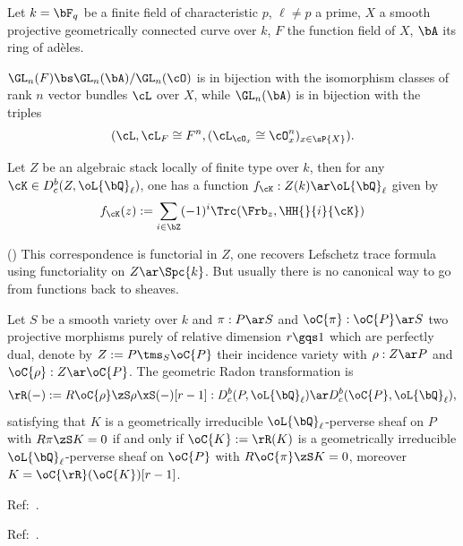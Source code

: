 \documentclass[a4paper, twoside]{article}
\begin{document}
\confighead{}{}{}


\begin{stp}
	Let $k=\bF_{q}$ be a finite field of characteristic $p$, $\ell\neq p$ a prime, $X$ a smooth projective geometrically connected curve over $k$, $F$ the function field of $X$, $\bA$ its ring of ad{\`e}les.
\end{stp}


$\GL_{n}(F)\bs\GL_{n}(\bA)/\GL_{n}(\cO)$ is in bijection with the isomorphism classes of rank $n$ vector bundles $\cL$ over $X$, while $\GL_{n}(\bA)$ is in bijection with the triples
\[
	(\cL, \cL_{F}\cong F^{n}, (\cL_{\cO_{x}}\cong\cO_{x}^{n})_{x\in\sP{X}}).
\]

Let $Z$ be an algebraic stack locally of finite type over $k$, then for any $\cK\in D_{c}^{b}(Z,\oL{\bQ}_{\ell})$, one has a function $f_{\cK}:Z(k)\ar\oL{\bQ}_{\ell}$ given by
\[
	f_{\cK}(z):=\sum_{i\in\bZ}(-1)^{i}\Trc(\Frb_{z},\HH{}{i}{\cK})
\]

\begin{rmk}
	(\cite[2.5]{Yun2014Rigidity}) This correspondence is functorial in $Z$, one recovers Lefschetz trace formula using functoriality on $Z\ar\Spc{k}$. But usually there is no canonical way to go from functions back to sheaves.
\end{rmk}

Let $S$ be a smooth variety over $k$ and $\pi:P\ar S$ and $\oC{\pi}:\oC{P}\ar S$ two projective morphisms purely of relative dimension $r\gqs1$ which are perfectly dual, denote by $Z:=P\tms_{S}\oC{P}$ their incidence variety with $\rho:Z\ar P$ and $\oC{\rho}:Z\ar\oC{P}$. The geometric Radon transformation is
\[
	\rR(-):=R\oC{\rho}\zS\rho\xS(-)[r-1]:D_{c}^{b}(P,\oL{\bQ}_{\ell})\ar D_{c}^{b}(\oC{P},\oL{\bQ}_{\ell}),
\]
satisfying that $K$ is a geometrically irreducible $\oL{\bQ}_{\ell}$-perverse sheaf on $P$ with $R\pi\zS K=0$ if and only if $\oC{K}:=\rR(K)$ is a geometrically irreducible $\oL{\bQ}_{\ell}$-perverse sheaf on $\oC{P}$ with $R\oC{\pi}\zS K=0$, moreover $K=\oC{\rR}(\oC{K})[r-1]$.

Ref:~\cite{Papikian2023}.


Ref:~\cite{LaumonDrinfeld1,LaumonDrinfeld2}.


\printref
\end{document}
